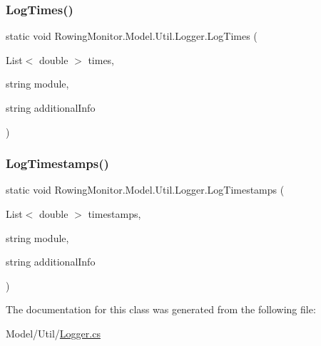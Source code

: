 \mbox{\label{class_rowing_monitor_1_1_model_1_1_util_1_1_logger_aa64fcd49049d76a54281be04da4c0d5b}} 
\subsubsection{\texorpdfstring{Log\+Times()}{LogTimes()}}
{\footnotesize\ttfamily static void Rowing\+Monitor.\+Model.\+Util.\+Logger.\+Log\+Times (\begin{DoxyParamCaption}\item[{List$<$ double $>$}]{times,  }\item[{string}]{module,  }\item[{string}]{additional\+Info }\end{DoxyParamCaption})\hspace{0.3cm}{\ttfamily [static]}}

\mbox{\label{class_rowing_monitor_1_1_model_1_1_util_1_1_logger_a2e14f39dd12fdf95095720632e55b621}} 
\subsubsection{\texorpdfstring{Log\+Timestamps()}{LogTimestamps()}}
{\footnotesize\ttfamily static void Rowing\+Monitor.\+Model.\+Util.\+Logger.\+Log\+Timestamps (\begin{DoxyParamCaption}\item[{List$<$ double $>$}]{timestamps,  }\item[{string}]{module,  }\item[{string}]{additional\+Info }\end{DoxyParamCaption})\hspace{0.3cm}{\ttfamily [static]}}



The documentation for this class was generated from the following file\+:\begin{DoxyCompactItemize}
\item 
Model/\+Util/\hyperlink{_logger_8cs}{Logger.\+cs}\end{DoxyCompactItemize}
